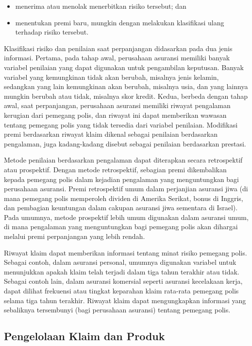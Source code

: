 \documentclass[
]{book}
\providecommand{\tightlist}{%
  \setlength{\itemsep}{0pt}\setlength{\parskip}{0pt}}
\begin{document}
\begin{itemize}
\tightlist
\item
  menerima atau menolak menerbitkan risiko tersebut; dan
\item
  menentukan premi baru, mungkin dengan melakukan klasifikasi ulang terhadap risiko tersebut.
\end{itemize}

Klasifikasi risiko dan penilaian saat perpanjangan didasarkan pada dua jenis informasi. Pertama, pada tahap awal, perusahaan asuransi memiliki banyak variabel penilaian yang dapat digunakan untuk pengambilan keputusan. Banyak variabel yang kemungkinan tidak akan berubah, misalnya jenis kelamin, sedangkan yang lain kemungkinan akan berubah, misalnya usia, dan yang lainnya mungkin berubah atau tidak, misalnya skor kredit. Kedua, berbeda dengan tahap awal, saat perpanjangan, perusahaan asuransi memiliki riwayat pengalaman kerugian dari pemegang polis, dan riwayat ini dapat memberikan wawasan tentang pemegang polis yang tidak tersedia dari variabel penilaian. Modifikasi premi berdasarkan riwayat klaim dikenal sebagai penilaian berdasarkan pengalaman, juga kadang-kadang disebut sebagai penilaian berdasarkan prestasi.

Metode penilaian berdasarkan pengalaman dapat diterapkan secara retrospektif atau prospektif. Dengan metode retrospektif, sebagian premi dikembalikan kepada pemegang polis dalam kejadian pengalaman yang menguntungkan bagi perusahaan asuransi. Premi retrospektif umum dalam perjanjian asuransi jiwa (di mana pemegang polis memperoleh dividen di Amerika Serikat, bonus di Inggris, dan pembagian keuntungan dalam cakupan asuransi jiwa sementara di Israel). Pada umumnya, metode prospektif lebih umum digunakan dalam asuransi umum, di mana pengalaman yang menguntungkan bagi pemegang polis akan dihargai melalui premi perpanjangan yang lebih rendah.

Riwayat klaim dapat memberikan informasi tentang minat risiko pemegang polis. Sebagai contoh, dalam asuransi personal, umumnya digunakan variabel untuk menunjukkan apakah klaim telah terjadi dalam tiga tahun terakhir atau tidak. Sebagai contoh lain, dalam asuransi komersial seperti asuransi kecelakaan kerja, dapat dilihat frekuensi atau tingkat keparahan klaim rata-rata pemegang polis selama tiga tahun terakhir. Riwayat klaim dapat mengungkapkan informasi yang sebaliknya tersembunyi (bagi perusahaan asuransi) tentang pemegang polis.

\hypertarget{pengelolaan-klaim-dan-produk}{%
\subsection{Pengelolaan Klaim dan Produk}\label{pengelolaan-klaim-dan-produk}}
\end{document}
